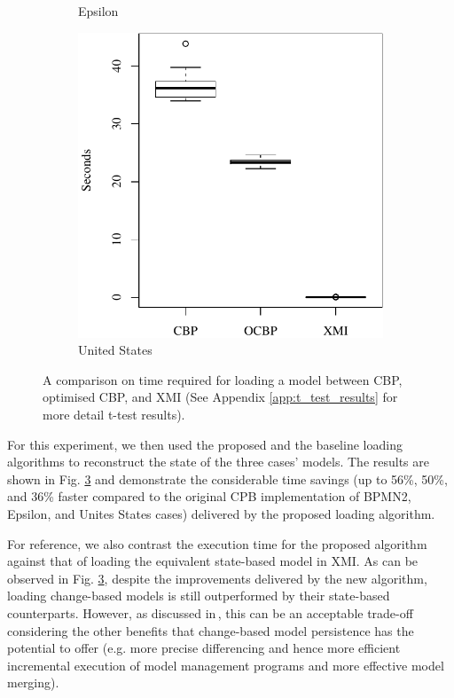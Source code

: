 \documentclass{llncs}
\begin{document}
\begin{figure}[ht]
\begin{subfigure}{0.325\textwidth}
        \caption{Epsilon}
        \label{fig:load_time_epsilon}
    \end{subfigure}
    \hfill
    \begin{subfigure}{0.325\textwidth}
        \centering
        \includegraphics[width=\linewidth]{images/load_time_wikipedia}
        \caption{United States}
        \label{fig:load_time_wikipedia}
    \end{subfigure}
    \caption{A comparison on time required for loading a model between CBP, optimised CBP, and XMI (See Appendix \ref{app:t_test_results} for more detail t-test results).}
    \label{fig:loadtime}
\end{figure}

For this experiment, we then used the proposed and the baseline loading algorithms to reconstruct the state of the three cases' models. The results are shown in Fig. \ref{fig:loadtime} and demonstrate the considerable time savings (up to 56\%, 50\%, and 36\% faster compared to the original CPB implementation of BPMN2, Epsilon, and Unites States cases) delivered by the proposed loading algorithm.

For reference, we also contrast the execution time for the proposed algorithm against that of loading the equivalent state-based model in XMI. As can be observed in Fig. \ref{fig:loadtime}, despite the improvements delivered by the new algorithm, loading change-based models is still outperformed by their state-based counterparts. However, as discussed in\,\cite{yohannis2017turning}, this can be an acceptable trade-off considering the other benefits that change-based model persistence has the potential to offer (e.g. more precise differencing and hence more efficient incremental execution of model management programs and more effective model merging).
\end{document}
